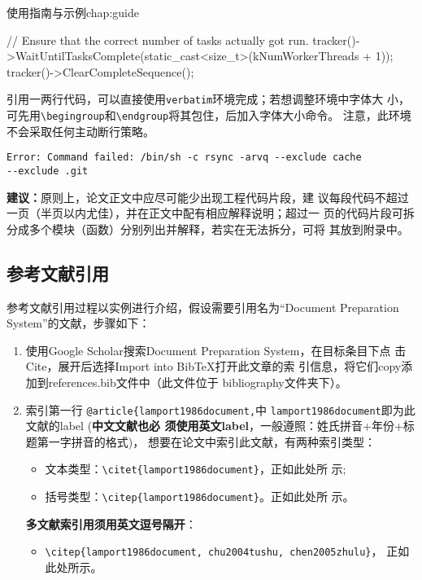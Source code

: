 \begin{cuzchapter}{使用指南与示例}{chap:guide}
\begin{listing}[H]
\begin{cppcode}
            // Ensure that the correct number of tasks actually got run.
            tracker()->WaitUntilTasksComplete(static_cast<size_t>(kNumWorkerThreads + 1));
            tracker()->ClearCompleteSequence();
        \end{cppcode}
    \end{listing}

	引用一两行代码，可以直接使用\texttt{verbatim}环境完成；若想调整环境中字体大
	小，可先用\verb|\begingroup|和\verb|\endgroup|将其包住，后加入字体大小命令。
	注意，此环境不会采取任何主动断行策略。

	\begingroup
	\small
	\begin{verbatim}
Error: Command failed: /bin/sh -c rsync -arvq --exclude cache
--exclude .git
    \end{verbatim}
	\endgroup

	\begin{leftbar}
		\noindent\textbf{建议：}原则上，论文正文中应尽可能少出现工程代码片段，建
		议每段代码不超过一页（半页以内尤佳），并在正文中配有相应解释说明；超过一
		页的代码片段可拆分成多个模块（函数）分别列出并解释，若实在无法拆分，可将
		其放到附录中。
	\end{leftbar}

	\subsection{参考文献引用}\label{sub:references}

	参考文献引用过程以实例进行介绍，假设需要引用名为``Document Preparation
	System''的文献，步骤如下：
	\begin{enumerate}
		\item 使用Google Scholar搜索Document Preparation System，在目标条目下点
		      击Cite，展开后选择Import into BibTeX打开此文章的索
		      引信息，将它们copy添加到references.bib文件中（此文件位于
		      bibliography文件夹下）。
		\item 索引第一行 \verb|@article{lamport1986document,|中
		      \verb|lamport1986document|即为此文献的label (\textbf{中文文献也必
			      须使用英文label}，一般遵照：姓氏拼音+年份+标题第一字拼音的格式)，
		      想要在论文中索引此文献，有两种索引类型：
		      \begin{itemize}
			      \item 文本类型：\verb|\citet{lamport1986document}|，正如此处所
			            示\citet{lamport1986document};
			      \item 括号类型：\verb|\citep{lamport1986document}|。正如此处所
			            示\citep{lamport1986document}。
		      \end{itemize}
		      \textbf{多文献索引用须用英文逗号隔开}：
		      \begin{itemize}
			      \item \verb|\citep{lamport1986document, chu2004tushu, chen2005zhulu}|，
			            正如此处所示\citep{lamport1986document, chu2004tushu, chen2005zhulu}。
		      \end{itemize}
	\end{enumerate}


\end{cuzchapter}
